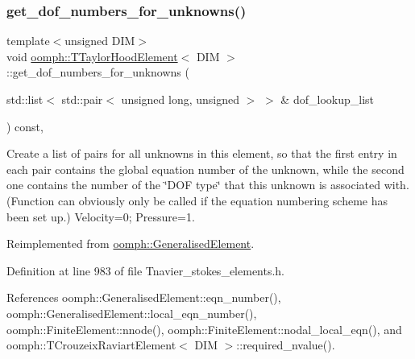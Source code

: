 \subsubsection{\texorpdfstring{get\+\_\+dof\+\_\+numbers\+\_\+for\+\_\+unknowns()}{get\_dof\_numbers\_for\_unknowns()}}
{\footnotesize\ttfamily template$<$unsigned D\+IM$>$ \\
void \hyperlink{classoomph_1_1TTaylorHoodElement}{oomph\+::\+T\+Taylor\+Hood\+Element}$<$ D\+IM $>$\+::get\+\_\+dof\+\_\+numbers\+\_\+for\+\_\+unknowns (\begin{DoxyParamCaption}\item[{std\+::list$<$ std\+::pair$<$ unsigned long, unsigned $>$ $>$ \&}]{dof\+\_\+lookup\+\_\+list }\end{DoxyParamCaption}) const\hspace{0.3cm}{\ttfamily [inline]}, {\ttfamily [virtual]}}



Create a list of pairs for all unknowns in this element, so that the first entry in each pair contains the global equation number of the unknown, while the second one contains the number of the \char`\"{}\+D\+O\+F type\char`\"{} that this unknown is associated with. (Function can obviously only be called if the equation numbering scheme has been set up.) Velocity=0; Pressure=1. 



Reimplemented from \hyperlink{classoomph_1_1GeneralisedElement_a069f59bfc3e607a5bebba52c6314d777}{oomph\+::\+Generalised\+Element}.



Definition at line 983 of file Tnavier\+\_\+stokes\+\_\+elements.\+h.



References oomph\+::\+Generalised\+Element\+::eqn\+\_\+number(), oomph\+::\+Generalised\+Element\+::local\+\_\+eqn\+\_\+number(), oomph\+::\+Finite\+Element\+::nnode(), oomph\+::\+Finite\+Element\+::nodal\+\_\+local\+\_\+eqn(), and oomph\+::\+T\+Crouzeix\+Raviart\+Element$<$ D\+I\+M $>$\+::required\+\_\+nvalue().

\mbox{\label{classoomph_1_1TTaylorHoodElement_a6442b4be0666587043f9a837c0054519}} 
